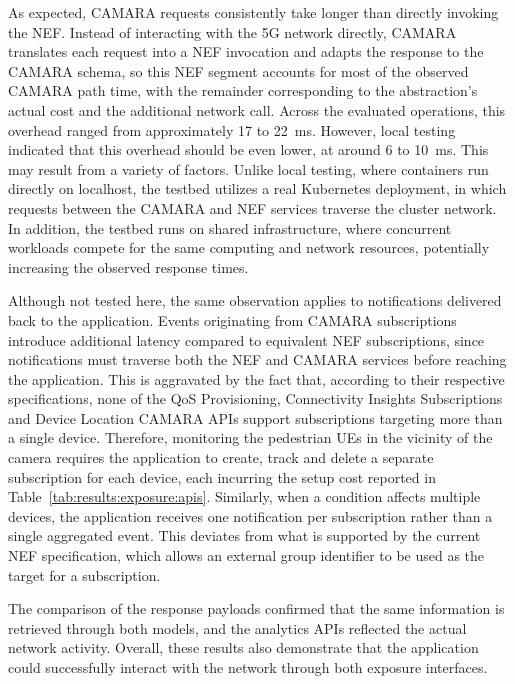 As expected, CAMARA requests consistently take longer than directly invoking the \acs{NEF}. Instead of interacting with the \acs{5G} network directly, CAMARA translates each request into a \acs{NEF} invocation and adapts the response to the CAMARA schema, so this \acs{NEF} segment accounts for most of the observed CAMARA path time, with the remainder corresponding to the abstraction's actual cost and the additional network call. Across the evaluated operations, this overhead ranged from approximately 17 to 22~ms. However, local testing indicated that this overhead should be even lower, at around 6 to 10~ms. This may result from a variety of factors. Unlike local testing, where containers run directly on localhost, the testbed utilizes a real Kubernetes deployment, in which requests between the CAMARA and \acs{NEF} services traverse the cluster network. In addition, the testbed runs on shared infrastructure, where concurrent workloads compete for the same computing and network resources, potentially increasing the observed response times.

Although not tested here, the same observation applies to notifications delivered back to the application. Events originating from CAMARA subscriptions introduce additional latency compared to equivalent \acs{NEF} subscriptions, since notifications must traverse both the \acs{NEF} and CAMARA services before reaching the application. This is aggravated by the fact that, according to their respective specifications, none of the \acs{QoS} Provisioning, Connectivity Insights Subscriptions and Device Location CAMARA \acsp{API} support subscriptions targeting more than a single device. Therefore, monitoring the pedestrian \acsp{UE} in the vicinity of the camera requires the application to create, track and delete a separate subscription for each device, each incurring the setup cost reported in Table~\ref{tab:results:exposure:apis}. Similarly, when a condition affects multiple devices, the application receives one notification per subscription rather than a single aggregated event. This deviates from what is supported by the current \acs{NEF} specification, which allows an external group identifier to be used as the target for a subscription.

The comparison of the response payloads confirmed that the same information is retrieved through both models, and the analytics \acsp{API} reflected the actual network activity. Overall, these results also demonstrate that the application could successfully interact with the network through both exposure interfaces.

